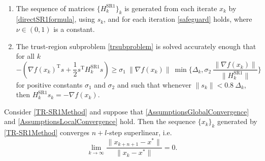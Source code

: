\begin{assumption}\label{RiemannianAssumptionsLocalConvergence} \ \\[-1.5\baselineskip]
    \begin{enumerate}
        \item The sequence of matrices $\{ H^{\mathrm{SR1}}_k \}_k$ is generated from each iterate $x_k$ by \cref{directSR1formula}, using $s_k$, and for each iteration \cref{safeguard} holds, where $\nu \in (0, 1)$ is a constant.
        \item The trust-region subproblem \cref{trsubproblem} is solved accurately enough that for all $k$ \begin{equation*} -(\nabla f(x_k)^{\mathrm{T}} s + \frac{1}{2} s^{\mathrm{T}} H^{\mathrm{SR1}}_k s) \geq \sigma_1 \ \lVert \nabla f(x_k) \rVert \ \min \{ \Delta_k, \sigma_2 \ \frac{\lVert \nabla f(x_k) \rVert}{\lVert H^{\mathrm{SR1}}_k \rVert} \} \end{equation*} for positive constants $\sigma_1$ and $\sigma_2$ and such that whenever $\lVert s_k \rVert < 0.8 \ \Delta_k$, then $H^{\mathrm{SR1}}_k s_k = - \nabla f(x_k)$.
    \end{enumerate}
\end{assumption}

\begin{theorem} \label{RiemannianLocalConvergence}
    Consider \cref{TR-SR1Method} and suppose that \cref{AssumptionsGlobalConvergence} and \cref{AssumptionsLocalConvergence} hold. Then the sequence $\{ x_k \}_k$ generated by \cref{TR-SR1Method} converges $n+l$-step superlinear, i.e. 
    \begin{equation}\label{n+1superlinear}
        \lim_{k \rightarrow \infty} \frac{\lVert x_{k+n+1} - x^* \rVert}{\lVert x_k - x^* \rVert} = 0.
    \end{equation}
\end{theorem}